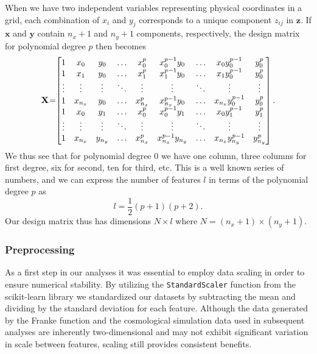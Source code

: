 \documentclass[aps,pra,english,notitlepage,reprint,nofootinbib]{revtex4-1}  %
\begin{document}
When we have two independent variables representing physical coordinates in a grid, each combination of $x_i$ and $y_j$ corresponds to a unique component $z_{ij}$ in $\mathbf{z}$. If $\mathbf{x}$ and $\mathbf{y}$ contain $n_x+1$ and $n_y+1$ components, respectively, the design matrix for polynomial degree $p$ then becomes
\begin{equation*}
  \mathbf{X} \hspace{-2pt}=\hspace{-3pt}\begin{bmatrix}
    1 & x_0 & y_0 & \ldots&x_0^p & x_0^{p-1}y_0 &\ldots& x_0y_0^{p-1}&y_0^p
    \\
    1 & x_1 & y_0 & \ldots & x_1^p & x_1^{p-1}y_0 &\ldots& x_1y_0^{p-1}&y_0^p
    \\
    \vdots&\vdots&\vdots&\ddots&\vdots&\vdots&\ddots&\vdots&\vdots
    \\
    1 & x_{n_x} & y_{0} & \ldots&x_{n_x}^p & x_{n_x}^{p-1}y_0 &\ldots& x_{n_x}y_0^{p-1}&y_0^p
    \\
    1 & x_0 & y_1 & \ldots& x_0^p & x_0^{p-1}y_1 &\ldots& x_0y_1^{p-1}&y_1^p
    \\
    \vdots&\vdots&\vdots&\ddots&\vdots&\vdots&\ddots&\vdots&\vdots
    \\
    1 & x_{n_x} & y_{n_y} & \ldots& x_{n_x}^p & x_{n_x}^{p-1}y_{n_y} &\ldots& x_{n_x}y_{n_y}^{p-1}&y_{n_y}^p
  \end{bmatrix}.
\end{equation*}
We thus see that for polynomial degree 0 we have one column, three columns for first degree, six for second, ten for third, etc. This is a well known series of numbers, and we can express the number of features $l$ in terms of the polynomial degree $p$ as
\begin{equation*}
  l = \frac{1}{2}(p+1)(p+2).
\end{equation*}
Our design matrix thus has dimensions $N\times l$ where $N=(n_x+1)\times(n_y+1)$.


\subsubsection{Preprocessing}
As a first step in our analyses it was essential to employ data scaling in order to ensure numerical stability. By utilizing the \verb|StandardScaler| function from the scikit-learn library \cite{scikit-learn} we standardized our datasets by subtracting the mean and dividing by the standard deviation for each feature. Although the data generated by the Franke function and the cosmological simulation data used in subsequent analyses are inherently two-dimensional and may not exhibit significant variation in scale between features, scaling still provides consistent benefits.
\end{document}
